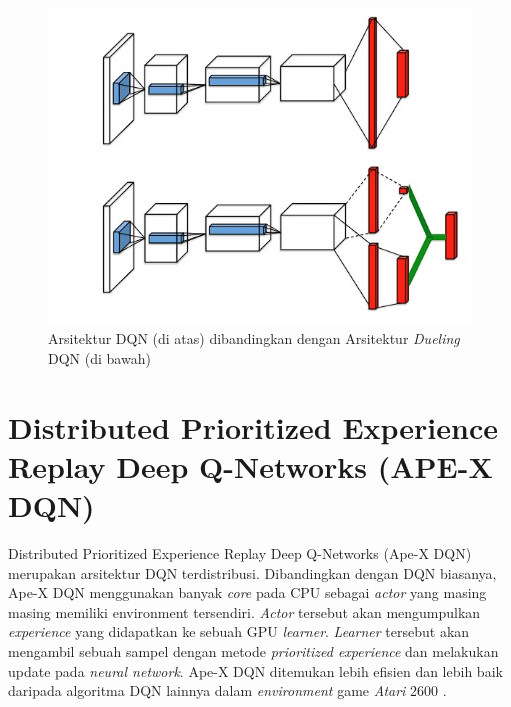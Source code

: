 \begin{figure}[H]
  \centering
    \includegraphics[scale=0.5]{gambar/dqn_vs_dueling_dqn_architecture.jpg}
    \caption{Arsitektur DQN (di atas) dibandingkan dengan Arsitektur \emph{Dueling} DQN (di bawah)}
    \label{fig:dqnVsDuelingDqnArchitecture}
\end{figure}

\section{Distributed Prioritized Experience Replay Deep Q-Networks (APE-X DQN)}

Distributed Prioritized Experience Replay Deep Q-Networks (Ape-X DQN) merupakan arsitektur DQN terdistribusi.
Dibandingkan dengan DQN biasanya, Ape-X DQN menggunakan banyak \emph{core} pada CPU sebagai \emph{actor} yang masing masing memiliki environment tersendiri.
\emph{Actor} tersebut akan mengumpulkan \emph{experience} yang didapatkan ke sebuah GPU \emph{learner}. 
\emph{Learner} tersebut akan mengambil sebuah sampel dengan metode \emph{prioritized experience} dan melakukan update pada \emph{neural network}. 
Ape-X DQN ditemukan lebih efisien dan lebih baik daripada algoritma DQN lainnya dalam \emph{environment} game \emph{Atari} 2600 \citep{apexDQN}.

